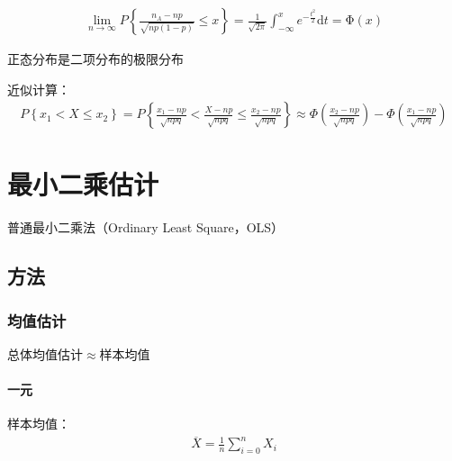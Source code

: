 \documentclass[12pt]{book}
\begin{document}
\begin{enumerate}[1.]
\begin{enumerate}[(1)]
\begin{enumerate}[a.]
                              \begin{gather*}
                                  \lim\limits_{n\rightarrow\infty}{P\left\{\frac{n_A-np}{\sqrt{np(1-p)}}\leqslant x\right\}}
                                  =\frac{1}{\sqrt{2\pi}}{ \int_{-\infty}^{x}{e^{-\frac{t^2}{2}} \mathrm{d}t} }
                                  =\mathrm{\Phi}(x)
                              \end{gather*}
                              \par 正态分布是二项分布的极限分布
                              \par 近似计算：
                              \begin{gather*}
                                  P\left\{x_1<X\leqslant x_2\right\}
                                  =P\left\{\frac{x_1-np}{\sqrt{npq}}<\frac{X-np}{\sqrt{npq}}\le\frac{x_2-np}{\sqrt{npq}}\right\}\approx\Phi\left(\frac{x_2-np}{\sqrt{npq}}\right)-\Phi\left(\frac{x_1-np}{\sqrt{npq}}\right)
                              \end{gather*}
                    \end{enumerate}
          \end{enumerate}
\end{enumerate}


\section{最小二乘估计}





普通最小二乘法（Ordinary Least Square，OLS）

\subsection{方法}

\subsubsection{均值估计}
总体均值估计$\approx$样本均值

\paragraph{一元}

样本均值：
\begin{gather*}
    \overline{X}=\frac{1}{n}\sum_{i=0}^{n}X_i
\end{gather*}
\end{document}
